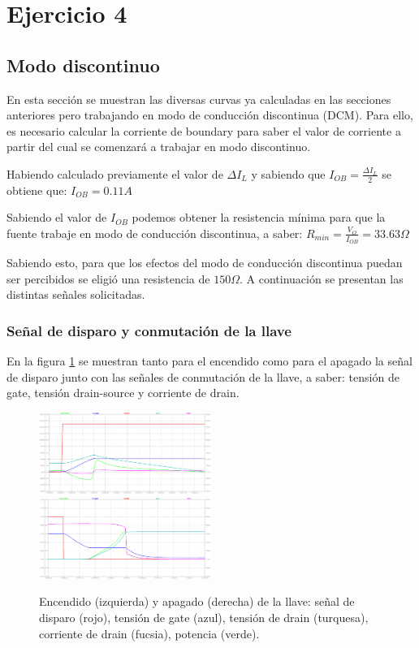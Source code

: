 \documentclass[e4_tp1_main.tex]{subfiles}
\begin{document}
	
	\section{Ejercicio 4}
	
	\subsection{Modo discontinuo}
	En esta sección se muestran las diversas curvas ya calculadas en las secciones anteriores pero trabajando en modo de conducción discontinua (DCM). Para ello, es necesario calcular la corriente de boundary para saber el valor de corriente a partir del cual se comenzará a trabajar en modo discontinuo.
	
	Habiendo calculado previamente el valor de $\Delta I_{L}$ y sabiendo que $I_{OB}=\frac{\Delta I_{L}}{2}$ se obtiene que: $I_{OB}=0.11A$    

	
	Sabiendo el valor de $I_{OB}$ podemos obtener la resistencia mínima para que la fuente trabaje en modo de conducción discontinua, a saber: $R_{min}=\frac{V_O}{I_{OB}}=33.63\Omega$

	
	Sabiendo esto, para que los efectos del modo de conducción discontinua puedan ser percibidos se eligió una resistencia de $150\Omega$.
	A continuación se presentan las distintas señales solicitadas.
	
	\subsubsection{Señal de disparo y conmutación de la llave}
	En la figura \ref{fig:llave_DCM} se muestran tanto para el encendido como para el apagado la señal de disparo junto con las señales de conmutación de la llave, a saber: tensión de gate, tensión drain-source y corriente de drain.
	
 	\begin{figure}[ht]
 		\centering
		\includegraphics[width=0.5\textwidth]{images/ej4/fig1.png}
		\includegraphics[width=0.5\textwidth]{images/ej4/fig2.png}
		\caption{Encendido (izquierda) y apagado (derecha) de la llave: señal de disparo (rojo), tensi\'on de gate (azul), tensi\'on de drain (turquesa), corriente de drain (fucsia), potencia (verde).}
		\label{fig:llave_DCM}
	\end{figure}
	
\end{document}
